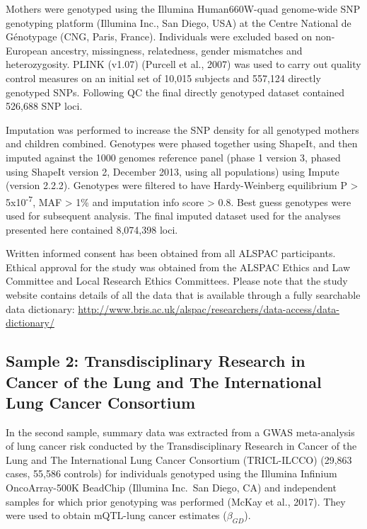 \documentclass[11pt,twoside]{bristolthesis}
\begin{document}
Mothers were genotyped using the Illumina Human660W-quad genome-wide SNP genotyping platform (Illumina Inc., San Diego, USA) at the Centre National de Génotypage (CNG, Paris, France). Individuals were excluded based on non-European ancestry, missingness, relatedness, gender mismatches and heterozygosity. PLINK (v1.07) (Purcell et al., 2007) was used to carry out quality control measures on an initial set of 10,015 subjects and 557,124 directly genotyped SNPs. Following QC the final directly genotyped dataset contained 526,688 SNP loci.

Imputation was performed to increase the SNP density for all genotyped mothers and children combined. Genotypes were phased together using ShapeIt, and then imputed against the 1000 genomes reference panel (phase 1 version 3, phased using ShapeIt version 2, December 2013, using all populations) using Impute (version 2.2.2). Genotypes were filtered to have Hardy-Weinberg equilibrium P \textgreater{} 5x10\textsuperscript{-7}, MAF \textgreater{} 1\% and imputation info score \textgreater{} 0.8. Best guess genotypes were used for subsequent analysis. The final imputed dataset used for the analyses presented here contained 8,074,398 loci.

Written informed consent has been obtained from all ALSPAC participants. Ethical approval for the study was obtained from the ALSPAC Ethics and Law Committee and Local Research Ethics Committees.
Please note that the study website contains details of all the data that is available through a fully searchable data dictionary: \url{http://www.bris.ac.uk/alspac/researchers/data-access/data-dictionary/}

\hypertarget{sample-2-transdisciplinary-research-in-cancer-of-the-lung-and-the-international-lung-cancer-consortium}{%
\subsection{Sample 2: Transdisciplinary Research in Cancer of the Lung and The International Lung Cancer Consortium}\label{sample-2-transdisciplinary-research-in-cancer-of-the-lung-and-the-international-lung-cancer-consortium}}

In the second sample, summary data was extracted from a GWAS meta-analysis of lung cancer risk conducted by the Transdisciplinary Research in Cancer of the Lung and The International Lung Cancer Consortium (TRICL-ILCCO) (29,863 cases, 55,586 controls) for individuals genotyped using the Illumina Infinium OncoArray-500K BeadChip (Illumina Inc.~San Diego, CA) and independent samples for which prior genotyping was performed (McKay et al., 2017). They were used to obtain mQTL-lung cancer estimates (\(\beta_{GD}\)).
\end{document}

